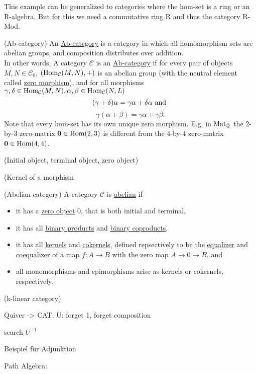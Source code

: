 This example can be generalized to categories where the hom-set is a ring or an R-algebra. But for this we need a commutative ring R and thus
the category R-Mod.

\begin{definition}{(Ab-category)}
An \ul{Ab-category} is a category in which all homomorphism sets are abelian groups, and composition distributes over addition.\\
In other words,
A category $\mathcal{C}$ is an \ul{Ab-category} if for every pair of objects $M,N \in \mathcal{C}_{0}$, $( \textup{Hom}_{\mathcal{C}}(M,N), + )$ is
an abelian group (with the neutral element called \ul{zero morphism}), and for all morphisms $\gamma, \delta \in \textup{Hom}_{\mathcal{C}}(M,N),
\alpha, \beta \in \textup{Hom}_{\mathcal{C}}(N,L)$
\[
(\gamma + \delta)\alpha = \gamma\alpha + \delta\alpha \textup{ and }\]\[
\gamma(\alpha+\beta) = \gamma\alpha + \gamma\beta.
\]
Note that every hom-set has its own unique zero morphism. E.g. in $\textup{Mat}_{\mathbb{Q}}$ the 2-by-3 zero-matrix $\mathbf{0} \in \textup{Hom}(2,3)$ is different from
the 4-by-4 zero-matrix $\mathbf{0} \in \textup{Hom}(4,4)$.
\end{definition}

\begin{definition}{(Initial object, terminal object, zero object)}

\end{definition}

\begin{example}{}

\end{example}

\begin{definition}{(Kernel of a morphism}

\end{definition}

\begin{definition}{(Abelian category)}
A category $\mathcal{C}$ is \ul{abelian} if
\begin{itemize}
\item it has a \ul{zero object} $0$, that is both initial and terminal,
\item it has all \ul{binary products} and \ul{binary coproducts},
\item it has all \ul{kernels} and \ul{cokernels}, defined repsectively to be the \ul{equalizer} and
\ul{coequalizer} of a map $f : A \rightarrow B$ with the zero map $A \rightarrow 0 \rightarrow B$, and
\item all monomorphisms and epimorphisms arise as kernels or cokernels, respectively.
\end{itemize}
\end{definition}

\begin{definition}{(k-linear category)}

\end{definition}


Quiver -> CAT: U: forget 1, forget composition

search $U^{-1}$

Beispiel für Adjunktion


Path Algebra:
